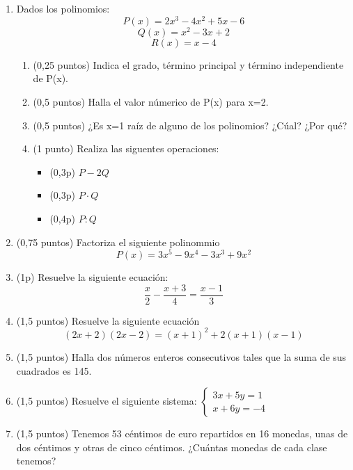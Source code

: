 \documentclass[a4paper,12pt]{extarticle}
\begin{document}
    \begin{enumerate}

        \item Dados los polinomios: 
        \[P(x) = 2x^3-4x^2+5x-6\]
        \[Q(x) = x^2 -3x+2\]
        \[R(x) = x-4\]

        \begin{enumerate}
            \item (0,25 puntos) Indica el grado, término principal y término independiente de P(x).
            \item (0,5 puntos) Halla el valor númerico de P(x) para x=2.
            \item (0,5 puntos) ¿Es x=1 raíz de alguno de los polinomios? ¿Cúal? ¿Por qué?
            \item (1 punto) Realiza las siguentes operaciones:
            \begin{itemize}
                \item (0,3p) $P-2Q$
                \item (0,3p) $ P \cdot Q $ 
                \item (0,4p) $ P : Q $ 
            \end{itemize} 
        \end{enumerate}

        \item (0,75 puntos) Factoriza el siguiente polinommio 
        \[P(x)= 3x^5 -9x^4-3x^3+9x^2\]
        \item (1p) Resuelve la siguiente ecuación:
        \[\dfrac{x}{2}-\dfrac{x+3}{4}=\dfrac{x-1}{3}\]
        \item (1,5 puntos) Resuelve la siguiente ecuación
        \[(2x+2)(2x-2)=(x+1)^2 +2(x+1)(x-1)\]
        \item (1,5 puntos) Halla dos números enteros consecutivos tales que la suma de sus cuadrados es 145. 
        \item (1,5 puntos) Resuelve el siguiente sistema: 
        $\left \{\begin{array}{rr}
                    3x+5y=1 \\
                    x+6y=-4
                \end{array}\right .$  

        \item (1,5 puntos) Tenemos 53 céntimos de euro repartidos en 16 monedas, unas de dos céntimos y otras de cinco céntimos. ¿Cuántas monedas de cada clase tenemos?
        
    \end{enumerate}
\end{document}

